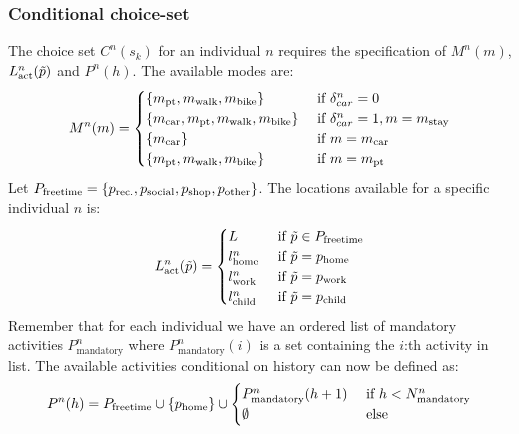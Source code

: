 \subsubsection{Conditional choice-set}
The choice set $C^n(s_k)$ for an individual $n$ requires the specification of $M^n(m)$, $L^n_{\text{act}}(\tilde{p})$ and $P^n(h)$.
The available modes are:
\begin{equation*}
M^n(m) = \begin{cases}
\{ \m{pt},\m{walk},\m{bike} \} & \cif \dummy{car}^n = 0 \\
\{ \m{car},\m{pt},\m{walk},\m{bike} \} & \cif \dummy{car}^n = 1,m = \m{stay} \\
\{ \m{car}\} & \cif m = \m{car} \\
\{ \m{pt},\m{walk},\m{bike} \} & \cif m = \m{pt} 
\end{cases}
\end{equation*}
Let $P_{\text{freetime}} = \{p_{\text{rec.}},p_{\text{social}},p_{\text{shop}},p_{\text{other}}\}$. The locations available for a specific individual $n$ is:
\begin{equation}
L^n_{\text{act}}(\act{p}) = \begin{cases}
L & \cif \act{p} \in P_{\text{freetime}} \\
l^n_\text{home} & \cif \act{p} = \p{home} \\
l^n_\text{work} & \cif \act{p} = \p{work} \\
l^n_\text{child} & \cif \act{p} = \p{child} \\
\end{cases}
\end{equation}
Remember that for each individual we have an ordered list of mandatory activities $P^n_{\text{mandatory}}$ where $P^n_{\text{mandatory}}(i)$ is a set containing the $i$:th activity in list. The available activities conditional on history can now be defined as:
\begin{equation}
P^n(h) = P_{\text{freetime}} \cup \{\p{home}\} \cup \begin{cases}
P^n_{\text{mandatory}}(h+1)& \cif h < N^n_\text{mandatory} \\
\emptyset & \celse
\end{cases}
\end{equation}
